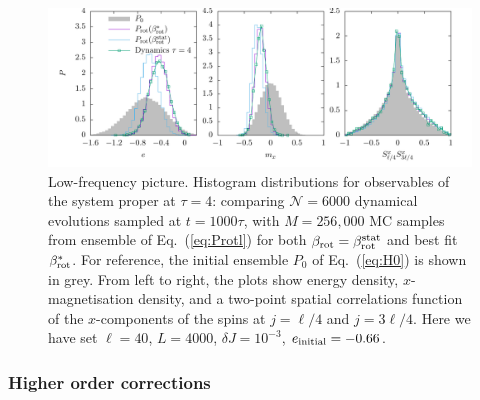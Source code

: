 \documentclass[aps,pre,twocolumn,notitlepage,floats,10pt]{revtex4-1}
\begin{document}
\begin{figure}[!ht]
  \includegraphics[width=0.95\linewidth]{figs/fig-4-low-frequency-histograms.pdf}
  \caption{
    Low-frequency picture.
    Histogram distributions for observables of the system proper at
    $\tau=4$: comparing $\mathcal{N}=6000$ dynamical evolutions sampled at
    $t=1000\tau$, with $M=256,000$ MC samples from ensemble of
    Eq.~(\ref{eq:Protl}) for both $\beta_{\rm rot}=\beta_{\rm rot}^{\rm
        stat}$ and best fit $\beta_{\rm rot}^*$.
    For reference, the initial ensemble $P_0$ of Eq.~(\ref{eq:H0}) is shown in
    grey.  From left to right, the plots show energy density, $x$-magnetisation
    density, and a two-point spatial correlations function of the $x$-components
    of the spins at $j=\ell/4$ and $j=3\ell/4$.
    Here we have set $\ell=40$, $L=4000$, $\delta J = 10^{-3}$, $e_{\rm
    initial}=-0.66$.
  } \label{fig:beta-rot-comp}
\end{figure}


\subsubsection{Higher order corrections}
\end{document}
